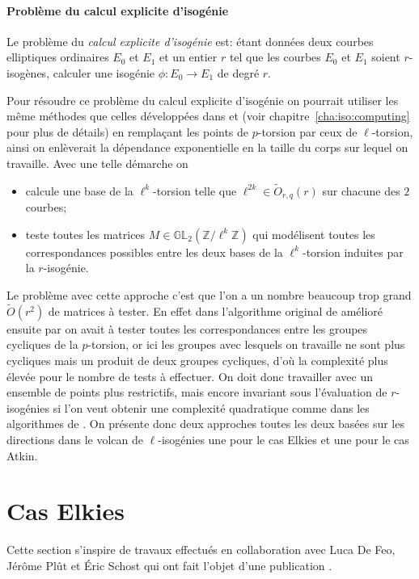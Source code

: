 \documentclass[10pt,a4paper]{book}
\theoremstyle{plain}
\theoremstyle{definition}
\theoremstyle{definition}
\theoremstyle{definition}
\theoremstyle{definition}
\theoremstyle{definition}
\theoremstyle{remark}
\theoremstyle{remark}
\theoremstyle{definition}
\begin{document}
\paragraph{Problème du calcul explicite d'isogénie} \label{prob:isogeny-problem}

Le problème du \emph{calcul explicite d'isogénie} est: étant données deux 
courbes elliptiques ordinaires $E_0$ et $E_1$ et un entier $r$ tel que les 
courbes $E_0$ et $E_1$ soient $r$-isogènes, calculer une isogénie $\phi:E_0 
\rightarrow E_1$ de degré $r$.

\smallskip

Pour résoudre ce problème du calcul explicite d'isogénie on pourrait utiliser 
les même méthodes que celles développées dans \cite{Couveignes96} et 
\cite{DeFeo11} (voir chapitre~\ref{cha:iso:computing} pour plus de détails) en 
remplaçant les points de $p$-torsion par ceux de $\ell$-torsion, ainsi on 
enlèverait la dépendance exponentielle en la taille du corps sur lequel on 
travaille. Avec une telle démarche on 
\begin{itemize}
\item calcule une base de la $\ell^k$-torsion telle que $\ell^{2k} \in \tilde 
{O}_{r,q}(r)$ sur chacune des $2$ courbes;
\item teste toutes les matrices $M \in \mathbb{GL}_2(\mathbb{Z}/\ell^k
\mathbb{Z})$ qui modélisent toutes les correspondances possibles entre les 
deux bases de la $\ell^k$-torsion induites par la $r$-isogénie.
\end{itemize}
Le problème avec cette approche c'est que l'on a un nombre beaucoup trop grand
$\tilde O(r^2)$ de matrices à tester. En effet dans l'algorithme original de 
\cite{Couveignes96} amélioré ensuite par \cite{DeFeo11} on avait à tester 
toutes les correspondances entre les groupes cycliques de la $p$-torsion, or 
ici les groupes avec lesquels on travaille ne sont plus cycliques mais un 
produit de deux groupes cycliques, d'où la complexité plus élevée pour le nombre 
de tests à effectuer. On doit donc travailler avec un ensemble de 
points plus restrictifs, mais encore invariant sous l'évaluation de $r$-isogénies 
si l'on veut obtenir une complexité quadratique comme dans
les algorithmes de \cite{DeFeo11}. On présente donc deux approches toutes les 
deux basées sur les directions dans le volcan de $\ell$-isogénies une pour le 
cas Elkies et une pour le cas Atkin.

\section{Cas Elkies}
\label{sec:cou:elk}
 Cette section s'inspire de travaux effectués en collaboration avec Luca De Feo,
J\'er\^ome Pl\^ut et \'Eric Schost qui ont fait l'objet d'une publication 
\cite{Defeo_Plut_Schost_2016}. 
\end{document}
